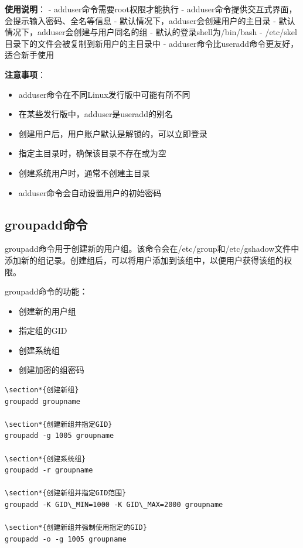 \documentclass[12pt,UTF8]{ctexbook}
\begin{document}
\textbf{使用说明}：
- adduser命令需要root权限才能执行
- adduser命令提供交互式界面，会提示输入密码、全名等信息
- 默认情况下，adduser会创建用户的主目录
- 默认情况下，adduser会创建与用户同名的组
- 默认的登录shell为/bin/bash
- /etc/skel目录下的文件会被复制到新用户的主目录中
- adduser命令比useradd命令更友好，适合新手使用

\textbf{注意事项}：
\begin{itemize}
    \item adduser命令在不同Linux发行版中可能有所不同
    \item 在某些发行版中，adduser是useradd的别名
    \item 创建用户后，用户账户默认是解锁的，可以立即登录
    \item 指定主目录时，确保该目录不存在或为空
    \item 创建系统用户时，通常不创建主目录
    \item adduser命令会自动设置用户的初始密码
\end{itemize}

\subsection{groupadd命令}
groupadd命令用于创建新的用户组。该命令会在/etc/group和/etc/gshadow文件中添加新的组记录。创建组后，可以将用户添加到该组中，以便用户获得该组的权限。

groupadd命令的功能：
\begin{itemize}
    \item 创建新的用户组
    \item 指定组的GID
    \item 创建系统组
    \item 创建加密的组密码
\end{itemize}

\begin{verbatim}
\section*{创建新组}
groupadd groupname

\section*{创建新组并指定GID}
groupadd -g 1005 groupname

\section*{创建系统组}
groupadd -r groupname

\section*{创建新组并指定GID范围}
groupadd -K GID\_MIN=1000 -K GID\_MAX=2000 groupname

\section*{创建新组并强制使用指定的GID}
groupadd -o -g 1005 groupname
\end{verbatim}
\end{document}
